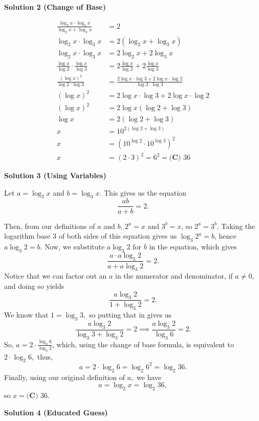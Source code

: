 \begin{enumerate}
\textbf{Solution 2 (Change of Base)}

\begin{align*}\frac{\log_2x \cdot \log_3x}{\log_2x+\log_3x} &= 2 \\[6pt]\log_2x \cdot \log_3x &= 2(\log_2x+\log_3x) \\[6pt]\log_2x \cdot \log_3x &= 2\log_2x + 2\log_3x \\[6pt]\frac{\log x}{\log 2} \cdot \frac{\log x}{\log 3} &= 2\frac{\log x}{\log 2} + 2\frac{\log x}{\log 3} \\[6pt]\frac{(\log x)^2}{\log 2 \cdot \log 3} &= \frac{2\log x \cdot \log 3 + 2\log x \cdot \log 2}{\log 2 \cdot \log 3} \\[6pt](\log x)^2 &= 2\log x \cdot \log 3 + 2\log x \cdot \log 2 \\[6pt](\log x)^2 &= 2\log x(\log 2 + \log 3) \\[6pt]\log x &= 2(\log 2 + \log 3) \\[6pt]x &= 10^{2(\log 2 + \log 3)} \\[6pt]x &= (10^{\log 2} \cdot 10^{\log 3})^2 \\[6pt]x &= (2 \cdot 3)^2 = 6^2 = \boxed{\textbf{(C) }36}\end{align*}


 



\textbf{Solution 3 (Using Variables)}

Let $a=\log_2x$ and $b=\log_3x$. This gives us the equation 
 \[\frac{ab}{a+b}=2.\]

 Then, from our definitions of $a$ and $b$, $2^a=x$ and $3^b=x$, so $2^a=3^b.$ Taking the logarithm base $3$ of both sides of this equation gives us $\log_3 2^a=b$, hence $a \log_3 2=b.$ Now, we substitute $a \log_3 2$ for $b$ in the equation, which gives 
 \[\frac{a \cdot a \log_3 2}{a+a \log_3 2}=2.\]Notice that we can factor out an $a$ in the numerator and denominator, if $a \neq 0,$ and doing so yields 
 \[\frac{a \log_3 2}{1+\log_3 2}=2.\] We know that $1= \log_3 3,$ so putting that in gives us 
 \[\frac{a \log_3 2}{\log_3 3+\log_3 2}=2 \implies \frac{a \log_3 2}{\log_3 6}=2.\]So, $a=2 \cdot  \frac{\log_3 6}{\log_3 2}$, which, using the change of base formula, is equivalent to $2 \cdot \log_2 6,$ thus, 
 \[a=2 \cdot \log_2 6= \log _2 6^2= \log _2 36.\] Finally, using our original definition of $a,$ we have 
 \[a = \log_2 x=\log_2 36,\] so $x=\boxed{\textbf{(C) }36}.$




\textbf{Solution 4 (Educated Guess)}


\end{enumerate}
